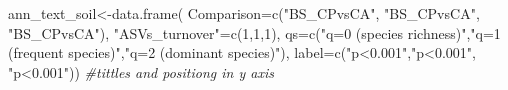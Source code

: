 \documentclass[]{interact}
\theoremstyle{plain}%
\theoremstyle{definition}
\theoremstyle{remark}
\newenvironment{Shaded}{\begin{snugshade}}{\end{snugshade}}
\newcommand{\AttributeTok}[1]{\textcolor[rgb]{0.77,0.63,0.00}{#1}}
\newcommand{\CommentTok}[1]{\textcolor[rgb]{0.56,0.35,0.01}{\textit{#1}}}
\newcommand{\DecValTok}[1]{\textcolor[rgb]{0.00,0.00,0.81}{#1}}
\newcommand{\FunctionTok}[1]{\textcolor[rgb]{0.00,0.00,0.00}{#1}}
\newcommand{\NormalTok}[1]{#1}
\newcommand{\OtherTok}[1]{\textcolor[rgb]{0.56,0.35,0.01}{#1}}
\newcommand{\StringTok}[1]{\textcolor[rgb]{0.31,0.60,0.02}{#1}}
\begin{document}
\begin{Shaded}
\begin{Highlighting}[]
\NormalTok{ann\_text\_soil}\OtherTok{\textless{}{-}}\FunctionTok{data.frame}\NormalTok{(}
  \AttributeTok{Comparison=}\FunctionTok{c}\NormalTok{(}\StringTok{"BS\_CPvsCA"}\NormalTok{, }\StringTok{"BS\_CPvsCA"}\NormalTok{, }\StringTok{"BS\_CPvsCA"}\NormalTok{),}
  \StringTok{"ASVs\_turnover"}\OtherTok{=}\FunctionTok{c}\NormalTok{(}\DecValTok{1}\NormalTok{,}\DecValTok{1}\NormalTok{,}\DecValTok{1}\NormalTok{),}
  \AttributeTok{qs=}\FunctionTok{c}\NormalTok{(}\StringTok{"q=0 (species richness)"}\NormalTok{,}\StringTok{"q=1 (frequent species)"}\NormalTok{,}\StringTok{"q=2 (dominant species)"}\NormalTok{),}
  \AttributeTok{label=}\FunctionTok{c}\NormalTok{(}\StringTok{"p\textless{}0.001"}\NormalTok{,}\StringTok{"p\textless{}0.001"}\NormalTok{, }\StringTok{"p\textless{}0.001"}\NormalTok{)) }\CommentTok{\#tittles and positiong in y axis}


\end{Highlighting}
\end{Shaded}
\end{document}
